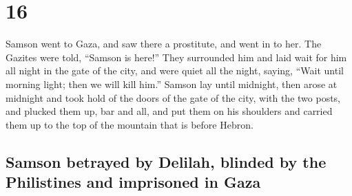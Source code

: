 \hypertarget{section-15}{%
\section{16}\label{section-15}}

 Samson went to Gaza, and saw there a prostitute, and went
in to her.  The Gazites were told, ``Samson is here!''
They surrounded him and laid wait for him all night in the gate of the
city, and were quiet all the night, saying, ``Wait until morning light;
then we will kill him.''  Samson lay until midnight, then
arose at midnight and took hold of the doors of the gate of the city,
with the two posts, and plucked them up, bar and all, and put them on
his shoulders and carried them up to the top of the mountain that is
before Hebron.

\hypertarget{samson-betrayed-by-delilah-blinded-by-the-philistines-and-imprisoned-in-gaza}{%
\subsection{Samson betrayed by Delilah, blinded by the Philistines and
imprisoned in
Gaza}\label{samson-betrayed-by-delilah-blinded-by-the-philistines-and-imprisoned-in-gaza}}

